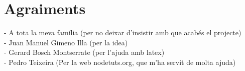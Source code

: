 \chapter*{Agraiments}

- A tota la meva família (per no deixar d'insistir amb que acabés el projecte) \\
- Juan Manuel Gimeno Illa (per la idea) \\
- Gerard Bosch Montserrate (per l'ajuda amb latex) \\
- Pedro Teixeira (Per la web nodetuts.org, que m'ha servit de molta ajuda) \\
